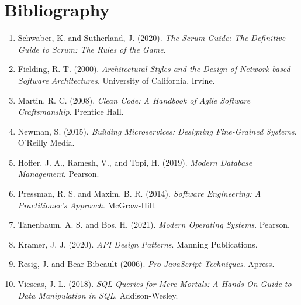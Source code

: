 \documentclass[12pt]{report}
\begin{document}
\cleardoublepage
{}
{}
\chapter*{Bibliography}
\begin{enumerate}
    \item Schwaber, K. and Sutherland, J. (2020). \textit{The Scrum Guide: The Definitive Guide to Scrum: The Rules of the Game}.
    \item Fielding, R. T. (2000). \textit{Architectural Styles and the Design of Network-based Software Architectures}. University of California, Irvine.
    \item Martin, R. C. (2008). \textit{Clean Code: A Handbook of Agile Software Craftsmanship}. Prentice Hall.
    \item Newman, S. (2015). \textit{Building Microservices: Designing Fine-Grained Systems}. O'Reilly Media.
    \item Hoffer, J. A., Ramesh, V., and Topi, H. (2019). \textit{Modern Database Management}. Pearson.
    \item Pressman, R. S. and Maxim, B. R. (2014). \textit{Software Engineering: A Practitioner's Approach}. McGraw-Hill.
    \item Tanenbaum, A. S. and Bos, H. (2021). \textit{Modern Operating Systems}. Pearson.
    \item Kramer, J. J. (2020). \textit{API Design Patterns}. Manning Publications.
    \item Resig, J. and Bear Bibeault (2006). \textit{Pro JavaScript Techniques}. Apress.
    \item Viescas, J. L. (2018). \textit{SQL Queries for Mere Mortals: A Hands-On Guide to Data Manipulation in SQL}. Addison-Wesley.
\end{enumerate}
\end{document}
